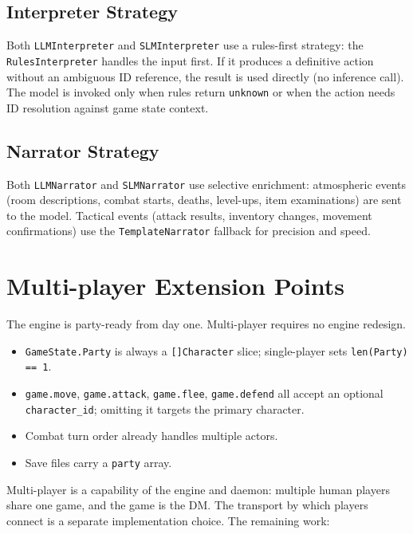 \documentclass[a4paper,10pt]{article}
\newcommand{\field}[1]{\texttt{#1}}
\begin{document}
\subsection{Interpreter Strategy}

Both \texttt{LLMInterpreter} and \texttt{SLMInterpreter} use a
rules-first strategy: the \texttt{RulesInterpreter} handles the
input first.  If it produces a definitive action without an ambiguous
ID reference, the result is used directly (no inference call).  The
model is invoked only when rules return \texttt{unknown} or when the
action needs ID resolution against game state context.

\subsection{Narrator Strategy}

Both \texttt{LLMNarrator} and \texttt{SLMNarrator} use selective
enrichment: atmospheric events (room descriptions, combat starts,
deaths, level-ups, item examinations) are sent to the model.
Tactical events (attack results, inventory changes, movement
confirmations) use the \texttt{TemplateNarrator} fallback for
precision and speed.

\section{Multi-player Extension Points}

The engine is party-ready from day one.  Multi-player requires no
engine redesign.

\begin{itemize}
  \item \texttt{GameState.Party} is always a \texttt{[]Character}
    slice; single-player sets \texttt{len(Party) == 1}.
  \item \texttt{game.move}, \texttt{game.attack}, \texttt{game.flee},
    \texttt{game.defend} all accept an optional \field{character\_id};
    omitting it targets the primary character.
  \item Combat turn order already handles multiple actors.
  \item Save files carry a \field{party} array.
\end{itemize}

Multi-player is a capability of the engine and daemon: multiple human
players share one game, and the game is the DM.  The transport by which
players connect is a separate implementation choice.  The remaining work:
\end{document}

